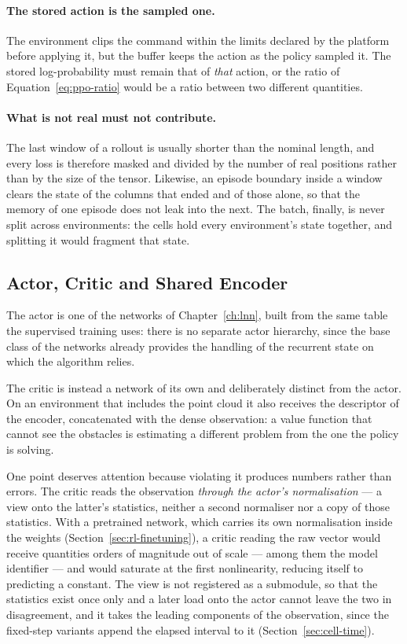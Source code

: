 \paragraph{The stored action is the sampled one.}
The environment clips the command within the limits declared by the platform
before applying it, but the buffer keeps the action as the policy sampled it.
The stored log-probability must remain that of \emph{that} action, or the ratio
of Equation~\eqref{eq:ppo-ratio} would be a ratio between two different
quantities.

\paragraph{What is not real must not contribute.}
The last window of a rollout is usually shorter than the nominal length, and
every loss is therefore masked and divided by the number of real positions
rather than by the size of the tensor. Likewise, an episode boundary inside a
window clears the state of the columns that ended and of those alone, so that
the memory of one episode does not leak into the next. The batch, finally, is
never split across environments: the cells hold every environment's state
together, and splitting it would fragment that state.

\subsection{Actor, Critic and Shared Encoder}
\label{sec:rl-networks}

The actor is one of the networks of Chapter~\ref{ch:lnn}, built from the same
table the supervised training uses: there is no separate actor hierarchy, since
the base class of the networks already provides the handling of the recurrent
state on which the algorithm relies.

The critic is instead a network of its own and deliberately distinct from the
actor. On an environment that includes the point cloud it also receives the
descriptor of the encoder, concatenated with the dense observation: a value
function that cannot see the obstacles is estimating a different problem from
the one the policy is solving.

One point deserves attention because violating it produces numbers rather than
errors. The critic reads the observation \emph{through the actor's
normalisation} --- a view onto the latter's statistics, neither a second
normaliser nor a copy of those statistics. With a pretrained network, which
carries its own normalisation inside the weights
(Section~\ref{sec:rl-finetuning}), a critic reading the raw vector would receive
quantities orders of magnitude out of scale --- among them the model identifier
--- and would saturate at the first nonlinearity, reducing itself to predicting
a constant. The view is not registered as a submodule, so that the statistics
exist once only and a later load onto the actor cannot leave the two in
disagreement, and it takes the leading components of the observation, since the
fixed-step variants append the elapsed interval to it
(Section~\ref{sec:cell-time}).


